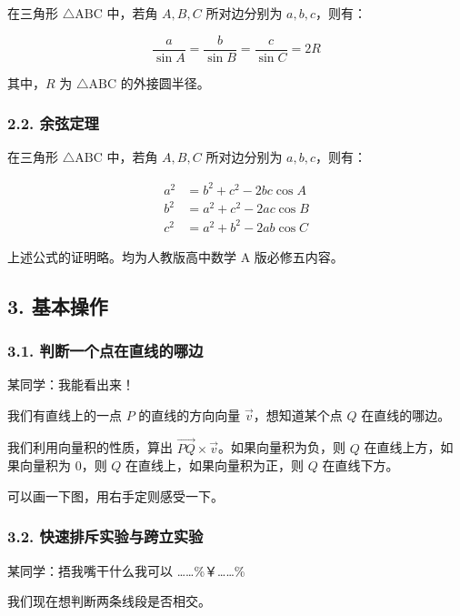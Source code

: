 在三角形 $\triangle \text{ABC}$ 中，若角 $A,B,C$ 所对边分别为 $a,b,c$，则有：

$$
\frac{a}{\sin A}=\frac{b}{\sin B}=\frac{c}{\sin C}=2R
$$

其中，$R$ 为 $\triangle \text{ABC}$ 的外接圆半径。

\subsubsection{2.2. 余弦定理}

在三角形 $\triangle \text{ABC}$ 中，若角 $A,B,C$ 所对边分别为 $a,b,c$，则有：

$$
\begin{align}
a^2&=b^2+c^2-2bc\cos A\\
b^2&=a^2+c^2-2ac\cos B\\
c^2&=a^2+b^2-2ab\cos C
\end{align}
$$

上述公式的证明略。均为人教版高中数学 A 版必修五内容。

\subsection{3. 基本操作}

\subsubsection{3.1. 判断一个点在直线的哪边}

\begin{QUOTE}{}{}
某同学：我能看出来！
\end{QUOTE}

我们有直线上的一点 $P$ 的直线的方向向量 $\vec v$，想知道某个点 $Q$ 在直线的哪边。

我们利用向量积的性质，算出 $\overrightarrow {PQ}\times \vec v$。如果向量积为负，则 $Q$ 在直线上方，如果向量积为 $0$，则 $Q$ 在直线上，如果向量积为正，则 $Q$ 在直线下方。

可以画一下图，用右手定则感受一下。

\subsubsection{3.2. 快速排斥实验与跨立实验}

\begin{QUOTE}{}{}
某同学：捂我嘴干什么我可以 ……\%￥……\%
\end{QUOTE}

我们现在想判断两条线段是否相交。


